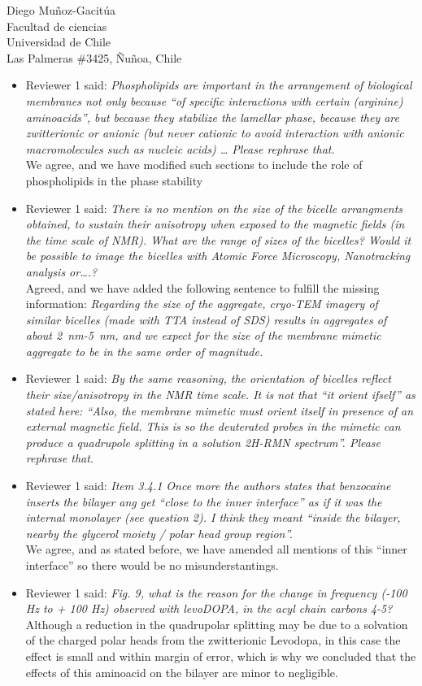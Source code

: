 \documentclass{letter}
\begin{document}
\begin{letter}{Diego Muñoz-Gacitúa\\ Facultad de ciencias \\ Universidad de
    Chile \\ Las Palmeras \#3425, Ñuñoa, Chile}
\begin{itemize}
  \item Reviewer 1 said: \textit{Phospholipids are important in the arrangement of biological membranes not only because “of specific interactions with certain (arginine) aminoacids”, but because they stabilize the lamellar phase, because they are zwitterionic or anionic (but never cationic to avoid interaction with anionic macromolecules such as nucleic acids) … Please rephrase that.}\\
  We agree, and we have modified such sections to include the role of
  phospholipids in the phase stability\
 
\item Reviewer 1 said: \textit{There is no mention on the size of the bicelle arrangments obtained, to sustain their anisotropy when exposed to the magnetic fields (in the time scale of NMR). What are the range of sizes of the bicelles? Would it be possible to image the bicelles with Atomic Force Microscopy, Nanotracking analysis or….?}\\
  Agreed, and we have added the following sentence to fulfill the missing
  information: \textit{Regarding the size of the aggregate, cryo-TEM imagery of similar
  bicelles (made with TTA instead of SDS)
  results in aggregates of about
  \SI{2}{nm}-\SI{5}{nm}, and we expect for the size of
  the membrane mimetic aggregate to be in the same order of magnitude.}

\item Reviewer 1 said: \textit{By the same reasoning, the orientation of
    bicelles reflect their size/anisotropy in the NMR time scale. It is not
    that ``it orient ifself'' as stated here: “Also, the membrane mimetic
    must orient itself in presence of an external magnetic field. This is so the
  deuterated probes in the mimetic can produce a quadrupole splitting in a
  solution 2H-RMN spectrum”. Please rephrase that.}

\item Reviewer 1 said: \textit{Item 3.4.1 Once more the authors states that
    benzocaine inserts the bilayer ang get ``close to the inner interface'' as if
    it was the internal monolayer (see question 2). I think they meant ``inside the
    bilayer, nearby the glycerol moiety / polar head group region''. }\\
  We agree, and as stated before, we have amended all mentions of this ``inner
  interface'' so there would be no misunderstantings.
  
\item Reviewer 1 said: \textit{Fig. 9, what is the reason for the change in
    frequency (-100 Hz to + 100 Hz) observed with levoDOPA, in the acyl chain
    carbons 4-5?}\\
	Although a reduction in the quadrupolar splitting may be due to a solvation of the charged polar heads from the zwitterionic Levodopa, in this case the effect is small and within margin of error, which is why we concluded that the effects of this aminoacid on the bilayer are minor to negligible.
	

\end{itemize}
\end{letter}
\end{document}
